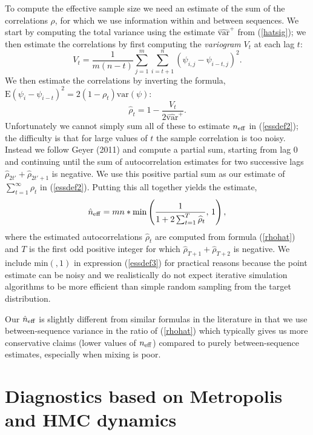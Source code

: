 \documentclass[11pt]{article}
\begin{document}
To compute the effective sample size we need an estimate of the sum of the correlations $\rho$, for which we use information within and between sequences.  We start by computing the total variance using the estimate $\widehat{\mbox{var}}^+$ from (\ref{hatsig}); we then estimate the correlations by first computing the {\em variogram} $V_t$ at each lag $t$:
$$
V_t = \frac{1}{m(n-t)} \sum_{j=1}^m\sum_{i=t+1}^n (\psi_{i,j} - \psi_{i\!-\!t,j})^2.
$$
We then estimate the correlations by inverting the formula, $\mbox{E}(\psi_i - \psi_{i-t})^2 = 2(1-\rho_t)\mbox{var}(\psi)$:
\begin{equation}\label{rhohat}
\widehat{\rho}_t = 1- \frac{V_t}{2\widehat{\mbox{var}}^+}.
\end{equation}
Unfortunately we cannot simply sum all of these to estimate $n_{\rm eff}$ in (\ref{essdef2}); the difficulty is that for large values of $t$ the sample correlation is too noisy.  Instead we follow Geyer (2011) and compute a partial sum, starting from lag 0 and continuing until the sum of autocorrelation estimates for two successive lags $\hat{\rho}_{2t'}+\hat{\rho}_{2t'+1}$ is negative.  We use this positive partial sum as our estimate of $\sum_{t=1}^{\infty}\rho_t$ in (\ref{essdef2}).  Putting this all together yields the estimate,
\begin{equation}\label{essdef3}
\hat{n}_{\rm eff} = mn*\mbox{min}\left(\frac{1}{1 + 2\sum_{t=1}^{T}\widehat{\rho}_t}, \,1\right),
\end{equation}
where the estimated autocorrelations $\widehat{\rho}_t $ are computed from formula (\ref{rhohat}) and $T$ is the first odd positive integer for which $\widehat{\rho}_{T+1}+\widehat{\rho}_{T+2}$ is negative.  We include $\mbox{min}(,1)$ in expression (\ref{essdef3}) for practical reasons because the point estimate can be noisy and we realistically do not expect iterative simulation algorithms to be more efficient than simple random sampling from the target distribution.

Our $\hat{n}_{\rm eff}$ is slightly different from similar formulas in the literature in that we use between-sequence variance in the ratio of (\ref{rhohat}) which typically gives us more conservative claims (lower values of $n_{\rm eff}$) compared to purely between-sequence estimates, especially when mixing is poor.

\section{Diagnostics based on Metropolis and HMC dynamics}
\end{document}
